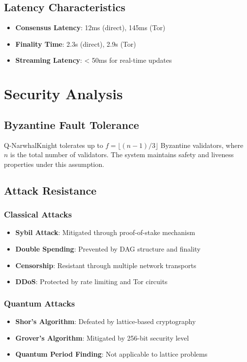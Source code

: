 \documentclass[11pt,a4paper]{article}
\begin{document}
\subsection{Latency Characteristics}

\begin{itemize}
    \item \textbf{Consensus Latency}: 12ms (direct), 145ms (Tor)
    \item \textbf{Finality Time}: 2.3s (direct), 2.9s (Tor)
    \item \textbf{Streaming Latency}: < 50ms for real-time updates
\end{itemize}

\section{Security Analysis}

\subsection{Byzantine Fault Tolerance}

Q-NarwhalKnight tolerates up to $f = \lfloor(n-1)/3\rfloor$ Byzantine validators, where $n$ is the total number of validators. The system maintains safety and liveness properties under this assumption.

\subsection{Attack Resistance}

\subsubsection{Classical Attacks}
\begin{itemize}
    \item \textbf{Sybil Attack}: Mitigated through proof-of-stake mechanism
    \item \textbf{Double Spending}: Prevented by DAG structure and finality
    \item \textbf{Censorship}: Resistant through multiple network transports
    \item \textbf{DDoS}: Protected by rate limiting and Tor circuits
\end{itemize}

\subsubsection{Quantum Attacks}
\begin{itemize}
    \item \textbf{Shor's Algorithm}: Defeated by lattice-based cryptography
    \item \textbf{Grover's Algorithm}: Mitigated by 256-bit security level
    \item \textbf{Quantum Period Finding}: Not applicable to lattice problems
\end{itemize}
\end{document}
